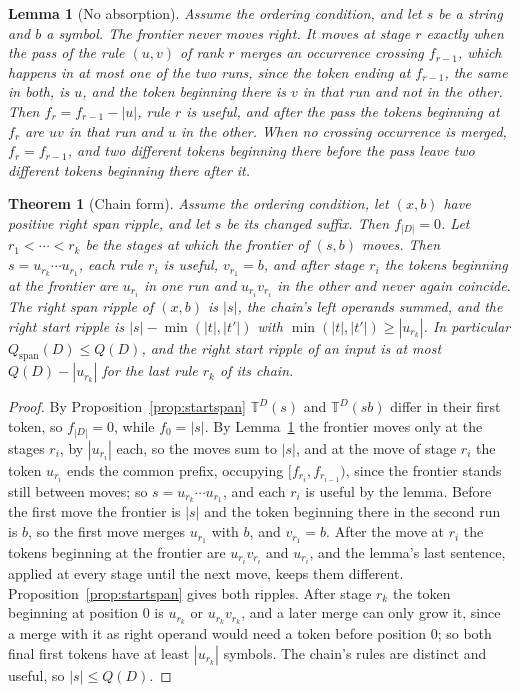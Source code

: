 \documentclass[11pt,a4paper]{article}
\theoremstyle{definition}
\theoremstyle{plain}
\newtheorem{lemma}{Lemma}
\newtheorem{theorem}{Theorem}
\newcommand{\T}{\mathbb{T}}
\begin{document}
\begin{lemma}[No absorption]\label{lem:noabsorb}
Assume the ordering condition, and let \(s\) be a string and \(b\) a symbol. The frontier never moves right. It moves at
stage \(r\) exactly when the pass of the rule \((u, v)\) of rank \(r\) merges an occurrence crossing \(f_{r-1}\), which
happens in at most one of the two runs, since the token ending at \(f_{r-1}\), the same in both, is \(u\), and the token
beginning there is \(v\) in that run and not in the other. Then \(f_r = f_{r-1} - |u|\), rule \(r\) is useful, and after
the pass the tokens beginning at \(f_r\) are \(uv\) in that run and \(u\) in the other. When no crossing occurrence is
merged, \(f_r = f_{r-1}\), and two different tokens beginning there before the pass leave two different tokens beginning
there after it.
\end{lemma}

\begin{theorem}[Chain form]\label{thm:chainform}
Assume the ordering condition, let \((x, b)\) have positive right span ripple, and let \(s\) be its changed suffix. Then
\(f_{|D|} = 0\). Let \(r_1 < \cdots < r_k\) be the stages at which the frontier of \((s, b)\) moves. Then
\(s = u_{r_k} \cdots u_{r_1}\), each rule \(r_i\) is useful, \(v_{r_1} = b\), and after stage \(r_i\) the tokens
beginning at the frontier are \(u_{r_i}\) in one run and \(u_{r_i} v_{r_i}\) in the other and never again coincide. The
right span ripple of \((x, b)\) is \(|s|\), the chain's left operands summed, and the right start ripple is
\(|s| - \min(|t|, |t'|)\) with \(\min(|t|, |t'|) \ge |u_{r_k}|\). In particular \(Q_{\mathrm{span}}(D) \le Q(D)\), and
the right start ripple of an input is at most \(Q(D) - |u_{r_k}|\) for the last rule \(r_k\) of its chain.
\end{theorem}

\begin{proof}
By Proposition~\ref{prop:startspan} \(\T^D(s)\) and \(\T^D(sb)\) differ in their first token, so \(f_{|D|} = 0\), while
\(f_0 = |s|\). By Lemma~\ref{lem:noabsorb} the frontier moves only at the stages \(r_i\), by \(|u_{r_i}|\) each, so the
moves sum to \(|s|\), and at the move of stage \(r_i\) the token \(u_{r_i}\) ends the common prefix, occupying
\([f_{r_i}, f_{r_{i-1}})\), since the frontier stands still between moves; so \(s = u_{r_k} \cdots u_{r_1}\), and each
\(r_i\) is useful by the lemma. Before the first move the frontier is \(|s|\) and the token beginning there in the
second run is \(b\), so the first move merges \(u_{r_1}\) with \(b\), and \(v_{r_1} = b\). After the move at \(r_i\) the
tokens beginning at the frontier are \(u_{r_i} v_{r_i}\) and \(u_{r_i}\), and the lemma's last sentence, applied at
every stage until the next move, keeps them different. Proposition~\ref{prop:startspan} gives both ripples. After stage
\(r_k\) the token beginning at position \(0\) is \(u_{r_k}\) or \(u_{r_k} v_{r_k}\), and a later merge can only grow it,
since a merge with it as right operand would need a token before position \(0\); so both final first tokens have at
least \(|u_{r_k}|\) symbols. The chain's rules are distinct and useful, so \(|s| \le Q(D)\).
\end{proof}
\end{document}
